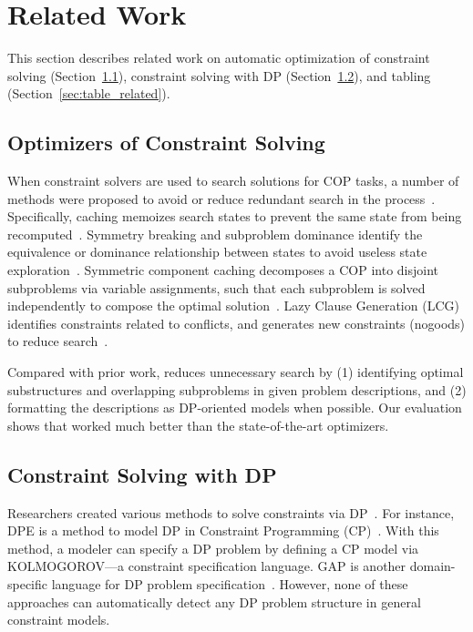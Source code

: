 \section{Related Work}
This section describes related work on automatic optimization of constraint solving (Section~\ref{sec:opt_related}), constraint solving with DP (Section~\ref{sec:dp_related}), and tabling (Section~\ref{sec:table_related}). 
    
\subsection{Optimizers of Constraint Solving}\label{sec:opt_related}
When constraint solvers are used to search solutions for COP tasks, 
a number of methods were proposed to avoid or reduce redundant search in the process~\cite{Smith2005,Gent2006,kitching2007symmetric,ohrimenko2009propagation,chu2012exploiting}. Specifically, 
caching memoizes search states to prevent the same state from being recomputed~\cite{Smith2005}. 
Symmetry breaking and subproblem dominance identify the equivalence or dominance relationship between states to avoid useless state  exploration~\cite{Gent2006,chu2012exploiting}. Symmetric component caching decomposes a COP into disjoint subproblems via variable assignments, such that each subproblem is solved independently to compose the optimal solution~\cite{kitching2007symmetric}. 
Lazy Clause Generation (LCG) identifies constraints related to conflicts, and generates new constraints (nogoods) to reduce search~\cite{ohrimenko2009propagation}.

Compared with prior work, \tool reduces unnecessary search by (1) identifying optimal substructures and overlapping subproblems in given problem descriptions, and (2) formatting the descriptions as DP-oriented models when possible. Our evaluation shows that \tool worked much better than the state-of-the-art optimizers.

\subsection{Constraint Solving with DP}
\label{sec:dp_related}
Researchers created various methods to solve constraints via DP~\cite{Moor1994Categories,Sauthoff2011Bellman,Morihata2014Dynamic,prestwich2018towards}.
For instance, DPE is a method to model DP in Constraint Programming (CP)~\cite{prestwich2018towards}. With this method, a modeler can specify a DP problem by defining a CP model via KOLMOGOROV---a constraint specification language. 
GAP is another domain-specific language for DP problem specification~\cite{Sauthoff2011Bellman}. However, 
none of these approaches can automatically detect any DP problem structure in general constraint models.

